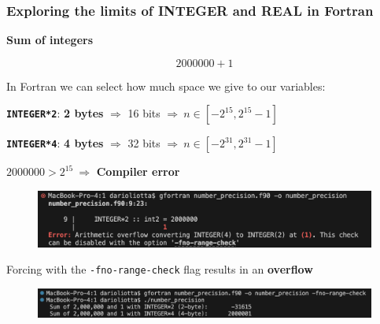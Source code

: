 \documentclass[10pt,externalviewer]{beamer}
\begin{document}
\begin{frame}
   \frametitle{Exploring the limits of INTEGER and REAL in Fortran}

   \begin{minipage}{0.45\textwidth}

      \begin{center}
         \textbf{Sum of integers}

         \vspace{-0.5cm}

         \scriptsize{$$\num{2000000}+1$$}
      \end{center}

      \footnotesize{In Fortran we can select how much space we give to our variables:}

      \begin{itemize}
         \footnotesize{\item \textcolor{BrickRed}{\textbf{\texttt{INTEGER*2}}}: \textbf{2 bytes} $\Rightarrow$ 16 bits $\Rightarrow \ n\in\left[-2^{15},2^{15}-1\right]$}
         \footnotesize{\item \textcolor{BrickRed}{\textbf{\texttt{INTEGER*4}}}: \textbf{4 bytes} $\Rightarrow$ 32 bits $\Rightarrow \ n\in\left[-2^{31},2^{31}-1\right]$}
      \end{itemize}

      \begin{center}
         \footnotesize{$\num{2000000}>2^{15} \ \Rightarrow$} \textcolor{BrickRed}{\textbf{Compiler error}}
      \end{center}

      \vspace{-0.25cm}

      \begin{figure}[H]
         \centering
         \includegraphics[width=\textwidth]{Immagini/integer_sum_error.png}
      \end{figure}

      \footnotesize{Forcing with the \texttt{-fno-range-check} flag results in an \textcolor{BrickRed}{\textbf{overflow}}}

      \begin{figure}[H]
         \centering
         \includegraphics[width=\textwidth]{Immagini/integer-sum-output.png}
      \end{figure}


\end{minipage}
\end{frame}
\end{document}
